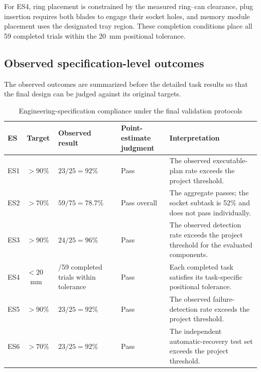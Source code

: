 For ES4, ring placement is constrained by the measured ring--can clearance,
plug insertion requires both blades to engage their socket holes, and memory
module placement uses the designated tray region. These completion conditions
place all 59 completed trials within the 20~mm positional tolerance.

\subsection{Observed specification-level outcomes}

The observed outcomes are summarized before the detailed task results so that
the final design can be judged against its original targets.

\begin{table}[htbp]
  \centering
  \caption{Engineering-specification compliance under the final validation protocols}
  \label{tab:ch5-es-compliance}
  \small
  \begin{tabularx}{\textwidth}{
    >{\centering\arraybackslash}p{}
    >{\centering\arraybackslash}p{}
    >{\centering\arraybackslash}p{}
    >{\centering\arraybackslash}p{}
    X}
    \toprule
    \textbf{ES} & \textbf{Target} & \textbf{Observed result} &
    \textbf{Point-estimate judgment} & \textbf{Interpretation} \\
    \midrule
    ES1 & \(>90\%\) & \(23/25=92\%\) & Pass &
    The observed executable-plan rate exceeds the project threshold. \\
    ES2 & \(>70\%\) & \(59/75=78.7\%\) & Pass overall &
    The aggregate passes; the socket subtask is 52\% and does not pass individually. \\
    ES3 & \(>90\%\) & \(24/25=96\%\) & Pass &
    The observed detection rate exceeds the project threshold for the evaluated components. \\
    ES4 & \(<20\)~mm & 59/59 completed trials within tolerance & Pass &
    Each completed task satisfies its task-specific positional tolerance. \\
    ES5 & \(>90\%\) & \(23/25=92\%\) & Pass &
    The observed failure-detection rate exceeds the project threshold. \\
    ES6 & \(>70\%\) & \(23/25=92\%\) & Pass &
    The independent automatic-recovery test set exceeds the project threshold. \\
    \bottomrule
  \end{tabularx}
\end{table}

